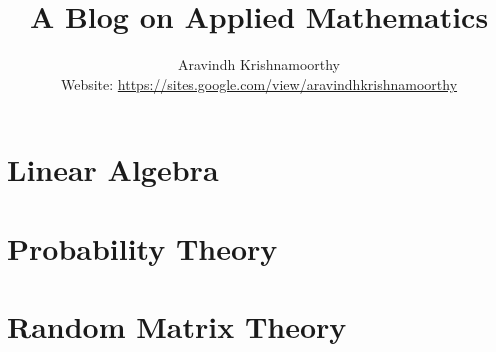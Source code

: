 \documentclass{book}
\title{A Blog on Applied Mathematics}
\author{Aravindh Krishnamoorthy\\\small Website: \url{https://sites.google.com/view/aravindhkrishnamoorthy}}
\begin{document}
\maketitle
\setcounter{tocdepth}{1}
\tableofcontents

\chapter{Linear Algebra}






\chapter{Probability Theory}








\chapter{Random Matrix Theory}







\end{document}
